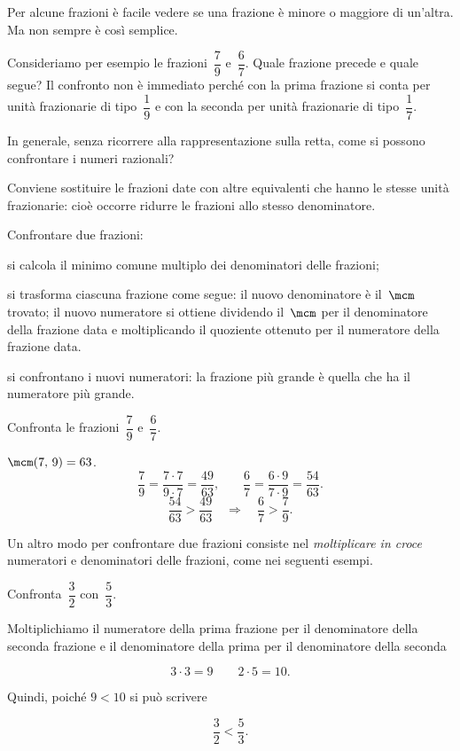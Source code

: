 Per alcune frazioni è facile vedere se una frazione è minore o maggiore di un'altra. Ma non sempre è così semplice.

Consideriamo per esempio le frazioni~$\dfrac{7}{9}$ e~$\dfrac{6}{7}$.
Quale frazione precede e quale segue? Il confronto non è immediato perché con la prima frazione si conta per
unità frazionarie di tipo~$\dfrac{1}{9}$ e con la seconda per unità frazionarie di tipo~$\dfrac{1}{7}$.

In generale, senza ricorrere alla rappresentazione sulla retta, come si possono confrontare i numeri razionali?

Conviene sostituire le frazioni date con altre equivalenti che hanno le stesse unità frazionarie:
cioè occorre ridurre le frazioni allo stesso denominatore.

\begin{procedura}
	Confrontare due frazioni:
\begin{enumeratea}
\item si calcola il minimo comune multiplo dei denominatori delle frazioni;
\item si trasforma ciascuna frazione come segue:
\subitem il nuovo denominatore è il~$\mcm$ trovato;
\subitem il nuovo numeratore si ottiene dividendo il~$\mcm$ per il denominatore della
	  frazione data e moltiplicando il quoziente ottenuto per il numeratore della frazione data.
\item si confrontano i nuovi numeratori: la frazione più grande è quella che ha il numeratore più
	grande.
\end{enumeratea}
\end{procedura}

\begin{exrig}
\begin{esempio}
Confronta le frazioni~$\dfrac{7}{9}$ e~$\dfrac{6}{7}$.

$\mcm(7\text{,~}9)=63$.
\[\frac{7}{9}=\frac{7\cdot7}{9\cdot7}=\frac{49}{63}\text{,}\qquad%
\frac{6}{7}=\frac{6\cdot9}{7\cdot9}=\frac{54}{63}.\]
\[\frac{54}{63}>\frac{49}{63}\quad\Rightarrow\quad\frac{6}{7}>\frac{7}{9}.\]
\end{esempio}
\end{exrig}

Un altro modo per confrontare due frazioni consiste nel \emph{moltiplicare in croce} numeratori e
denominatori delle frazioni, come nei seguenti esempi.

\pagebreak

\begin{exrig}
\begin{esempio}
Confronta~$\dfrac{3}{2}$ con~$\dfrac{5}{3}$.

Moltiplichiamo il numeratore della prima frazione per il denominatore della seconda frazione e
il denominatore della prima per il denominatore della seconda

 \[3\cdot3=9 \qquad 2\cdot5=10.\]

Quindi, poiché $9<10$ si può scrivere

 \[\dfrac{3}{2}<\dfrac{5}{3}.\]

\end{esempio}
\end{exrig}

